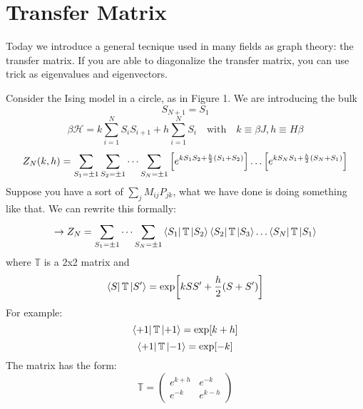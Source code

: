\documentclass[../main/main.tex]{subfiles}
\begin{document}

\section{Transfer Matrix}

Today we introduce a general tecnique used in many fields as graph theory: the transfer matrix. If you are able to diagonalize the transfer matrix, you can use trick as eigenvalues and eigenvectors.

Consider the Ising model in a circle, as in Figure 1.
We are introducing the bulk
\begin{equation}
  S_{N+1} = S_1
\end{equation}
\begin{equation}
  \beta \mathcal{H} = k \sum_{i=1}^{N} S_i S_{i+1} + h \sum_{i=1}^{N} S_i \quad \text{with} \quad k \equiv \beta J, h \equiv H \beta
\end{equation}
\begin{equation}
  Z_N (k,h) = \sum_{S_1 = \pm 1}^{} \sum_{S_2 = \pm 1}^{}  \dots \sum_{S_N = \pm 1}^{}
  \qty[e^{k S_1 S_2 + \frac{h}{2}(S_1+S_2)} ]\dots \qty[e^{k S_N S_1 + \frac{h}{2}(S_N+S_1)} ]
\end{equation}
Suppose you have a sort of \( \sum_{j}^{}  M_{ij} P_{jk} \), what we have done is doing something like that. We can rewrite this formally:
\begin{equation}
  \rightarrow Z_N = \sum_{S_1 = \pm 1}^{} \dots \sum_{S_N = \pm 1}^{} \bra{S_1} \mathbb{T} \ket{S_2} \bra{S_2}  \mathbb{T} \ket{S_3} \dots \bra{S_N}  \mathbb{T} \ket{S_1}
\end{equation}
where \( \mathbb{T} \) is a 2x2 matrix and
\begin{equation}
  \bra{S} \mathbb{T} \ket{S'} = \exp [k S S' + \frac{h}{2} (S+S')]
\end{equation}
For example:
\begin{equation}
  \bra{+1} \mathbb{T} \ket{+1} = \exp [k+h]
\end{equation}
\begin{equation}
  \bra{+1} \mathbb{T} \ket{-1} = \exp [-k]
\end{equation}
The matrix has the form:
\begin{equation}
  \mathbb{T} =
\begin{pmatrix}
e^{k+h}    & e^{-k}  \\
  e^{-k}  & e^{k-h}
\end{pmatrix}
\end{equation}
\end{document}
